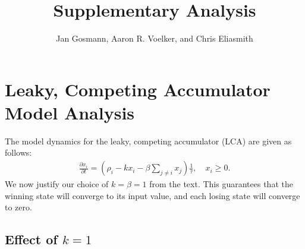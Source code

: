\documentclass[a4paper]{article}
\title{Supplementary Analysis}
\author{Jan Gosmann, Aaron R. Voelker, and Chris Eliasmith}
\begin{document}
\maketitle


\section{Leaky, Competing Accumulator Model Analysis}

The model dynamics for the leaky, competing accumulator (LCA) are given as follows:
\begin{equation}
    \begin{split}
        \frac{{\partial x}_i}{\partial t} = \left(\rho_i - kx_i - \beta \sum_{j \neq i} x_j\right) \frac{1}{\tau}, \quad x_i \ge 0 .
    \end{split}
\end{equation}
We now justify our choice of $k = \beta = 1$ from the text.
This guarantees that the winning state will converge to its input value, and each losing state will converge to zero.

\subsection{Effect of $k = 1$}
\end{document}
